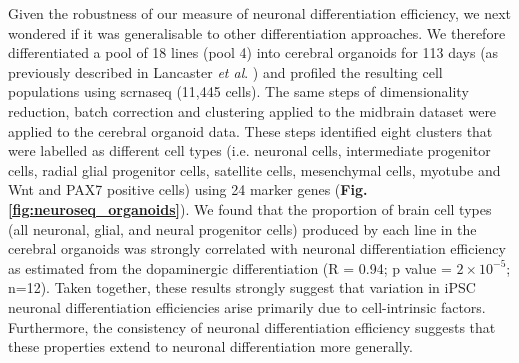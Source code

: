 Given the robustness of our measure of neuronal differentiation efficiency, we next wondered if it was generalisable to other differentiation approaches. 
We therefore differentiated a pool of 18 lines (pool 4) into cerebral organoids for 113 days (as previously described in Lancaster \textit{et al}. \cite{lancaster2017guided}) and profiled the resulting cell populations using \gls{scrnaseq} (11,445 cells). 
The same steps of dimensionality reduction, batch correction and clustering applied to the midbrain dataset were applied to the cerebral organoid data. 
These steps identified eight clusters that were labelled as different cell types (i.e. neuronal cells, intermediate progenitor cells, radial glial progenitor cells, satellite cells, mesenchymal cells, myotube and Wnt and PAX7 positive cells) using 24 marker genes (\textbf{Fig. \ref{fig:neuroseq_organoids}}).
We found that the proportion of brain cell types (all neuronal, glial, and neural progenitor cells) produced by each line in the cerebral organoids was strongly correlated with neuronal differentiation efficiency as estimated from the dopaminergic differentiation (R = 0.94; p value = $2 \times 10^{-5}$; n=12). 
Taken together, these results strongly suggest that variation in iPSC neuronal differentiation efficiencies arise primarily due to cell-intrinsic factors. 
Furthermore, the consistency of neuronal differentiation efficiency suggests that these properties extend to neuronal differentiation more generally.

